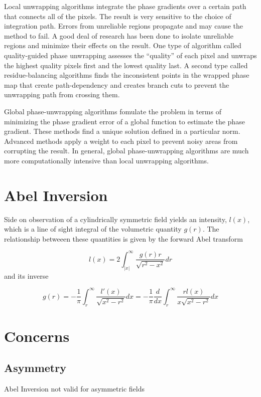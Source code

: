 \documentclass[11pt]{article} %
\begin{document}
Local unwrapping algorithms integrate the phase gradients over a certain path that connects all of the pixels. The result is very sensitive to the choice of integration path. Errors from unreliable regions propagate and may cause the method to fail. A good deal of research has been done to isolate unreliable regions and minimize their effects on the result. One type of algorithm called quality-guided phase unwrapping assesses the ``quality'' of each pixel and unwraps the highest quality pixels first and the lowest quality last. A second type called residue-balancing algorithms finds the inconsistent points in the wrapped phase map that create path-dependency and creates branch cuts to prevent the unwrapping path from crossing them.

Global phase-unwrapping algorithms fomulate the problem in terms of minimizing the phase gradient error of a global function to estimate the phase gradient. These methods find a unique solution defined in a particular norm. Advanced methods apply a weight to each pixel to prevent noisy areas from corrupting the result. In general, global phase-unwrapping algorithms are much more computationally intensive than local unwrapping algorithms.


\section{Abel Inversion}
Side on observation of a cylindrically symmetric field yields an intensity, $l(x)$, which is a line of sight integral of the volumetric quantity $g(r)$. The relationship betweeen these quantities is given by the forward Abel transform

\begin{equation}
	l(x) = 2 \int_{|x|}^\infty \frac{g(r) r}{\sqrt{r^2 - x^2}} dr
	\label{eq:fwd_abel}
\end{equation}
and its inverse

\begin{equation}
	g(r) = -\frac{1}{\pi} \int_r^\infty \frac{l'(x)}{\sqrt{x^2 -r^2}} dx = -\frac{1}{\pi} \frac{d}{dx}\int_r^\infty \frac{ r l(x)}{x \sqrt{x^2 - r^2 }} dx
	\label{eq:bw_abel}
\end{equation}


\section{Concerns}

\subsection{Asymmetry}
Abel Inversion not valid for asymmetric fields
\end{document}
